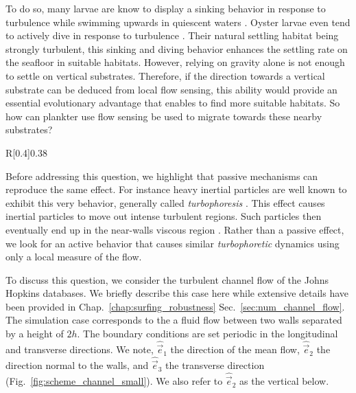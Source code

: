 To do so, many larvae are know to display a sinking behavior in response to turbulence while swimming upwards in quiescent waters \citep{fuchs2007effects, crimaldi2002hydrodynamics}.
Oyster larvae even tend to actively dive in response to turbulence \citep{fuchs2013active}.
Their natural settling habitat being strongly turbulent, this sinking and diving behavior enhances the settling rate on the seafloor in suitable habitats.
However, relying on gravity alone is not enough to settle on vertical substrates.
Therefore, if the direction towards a vertical substrate can be deduced from local flow sensing, this ability would provide an essential evolutionary advantage that enables to find more suitable habitats.
So how can plankter use flow sensing be used to migrate towards these nearby substrates?

\begin{wrapfigure}[10]{R}[0.4\width]{0.38\textwidth}
	\vspace{10pt}
	\centering
	\def\svgwidth{0.36\textwidth}
	
	\captionsetup{width=0.36\textwidth}
  	\caption{
  		Schematic of the channel flow of the Johns Hopkins Databases.
  	}
  	\label{fig:scheme_channel_small}
\end{wrapfigure}
Before addressing this question, we highlight that passive mechanisms can reproduce the same effect. 
For instance heavy inertial particles are well known to exhibit this very behavior, generally called \textit{turbophoresis} \citep{caporaloni1975transfer, reeks1983transport}.
This effect causes inertial particles to move out intense turbulent regions.
Such particles then eventually end up in the near-walls viscous region \citep{guha1997unified, guha2008transport, johnson2020turbophoresis}.
Rather than a passive effect, we look for an active behavior that causes similar \textit{turbophoretic} dynamics using only a local measure of the flow.

To discuss this question, we consider the turbulent channel flow of the Johns Hopkins databases.
We briefly describe this case here while extensive details have been provided in Chap.~\ref{chap:surfing_robustness} Sec.~\ref{sec:num_channel_flow}.
The simulation case corresponds to the a fluid flow between two walls separated by a height of $2h$.
The boundary conditions are set periodic in the longitudinal and transverse directions.
We note, $\hat{\vec{e}}_1$ the direction of the mean flow, $\hat{\vec{e}}_2$ the direction normal to the walls, and $\hat{\vec{e}}_3$ the transverse direction (Fig.~\ref{fig:scheme_channel_small}).
We also refer to $\hat{\vec{e}}_2$ as the vertical below.

